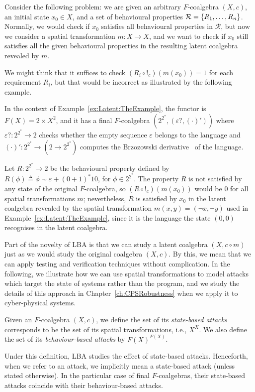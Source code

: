 Consider the following problem: we are given an arbitrary $F$-coalgebra $(X,c)$, an initial state $x_0\in X$, and a set of behavioural properties $\mathcal{R}=\left\{R_1, \ldots, R_n\right\}$. Normally, we would check if $x_0$ satisfies all behavioural properties in $\mathcal{R}$, but now we consider a spatial transformation $m\colon X\rightarrow X$, and we want to check if $x_0$ still satisfies all the given behavioural properties in the resulting latent coalgebra revealed by $m$.

We might think that it suffices to check $(R_i\circ !_c)(m(x_0))=1$ for each requirement $R_i$, but that would be incorrect as illustrated by the following example.
\begin{example}
    In the context of Example~\ref{ex:Latent:TheExample}, the functor is $F(X)=2\times X^2$, and it has a final $F$-coalgebra $(2^{2^*},(\varepsilon?,(\cdot)'))$ where $\varepsilon? \colon 2^{2^*}\rightarrow 2$ checks whether the empty sequence $\varepsilon$ belongs to the language and $(\cdot)'\colon 2^{2^*}\rightarrow (2\rightarrow {2^{2^*}})$ computes the Brzozowski derivative~\cite{BrzozowskiDerivative} of the language.  

    Let $R\colon 2^{2^*}\rightarrow 2$ be the behavioural property defined by $R(\phi)\triangleq \phi \sim \varepsilon+(0+1)^*10$, for $\phi \in 2^{2^*}$. The property $R$ is not satisfied by any state of the original $F$-coalgebra, so $(R\circ !_c)(m(x_0))$ would be 0 for all spatial transformations $m$; nevertheless, $R$ is satisfied by $x_0$ in the latent coalgebra revealed by the spatial transformation $m(x,y)=(\lnot x, \lnot y)$ used in Example~\ref{ex:Latent:TheExample}, since it is the language the state $(0,0)$ recognises in the latent coalgebra. 
\end{example}
Part of the novelty of LBA is that we can study a latent coalgebra $(X, c\circ m)$ just as we would study the original coalgebra $(X, c)$. By this, we mean that we can apply testing and verification techniques without complication. In the following, we illustrate how we can use spatial transformations to model attacks which target the state of systems rather than the program, and we study the details of this approach in Chapter~\ref{ch:CPSRobustness} when we apply it to cyber-physical systems.
\begin{definition}
    \label{def:Latent:StateAttacks}
    Given an $F$-coalgebra $(X,c)$, we define the set of its \emph{state-based attacks} corresponds to be the set of its spatial transformations, i.e., $X^X$. 
    We also define the set of its \emph{behaviour-based attacks} by $F(X)^{F(X)}$. 
    \end{definition}
Under this definition, LBA studies the effect of state-based attacks. Henceforth, when we refer to an attack, we implicitly mean a state-based attack (unless stated otherwise). In the particular case of final $F$-coalgebras, their state-based attacks coincide with their behaviour-based attacks. 

